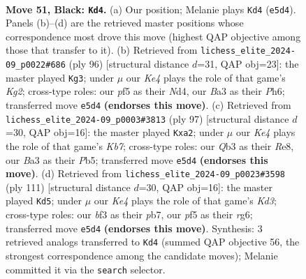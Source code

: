 \documentclass[11pt]{article}
\begin{document}
\clearpage

\begin{figure}[p]\centering
\begin{subfigure}{0.46\textwidth}\centering
\resizebox{\linewidth}{!}{%
\newchessgame
\chessboard[
  setfen={8/p7/8/1p2kPR1/8/bq3BK1/8/8 b - - 5 51},
  showmover=false,
  pgfstyle=straightmove, color=movearrow, markmove={e5-d4}
]}
\caption{}
\end{subfigure}\hfill
\begin{subfigure}{0.46\textwidth}\centering
\resizebox{\linewidth}{!}{%
\newchessgame
\chessboard[
  setfen={kn3Q2/1p6/7P/8/3N2P1/4P3/r5K1/8 w - - 3 49},
  showmover=false,
  pgfstyle=straightmove, color=movearrow, markmove={g2-g3}
]}
\caption{}
\end{subfigure}
\\[4pt]
\begin{subfigure}{0.46\textwidth}\centering
\resizebox{\linewidth}{!}{%
\newchessgame
\chessboard[
  setfen={4r3/4B3/4R3/1p6/2p5/8/Pk4P1/6K1 b - - 0 49},
  showmover=false,
  pgfstyle=straightmove, color=movearrow, markmove={b2-a2}
]}
\caption{}
\end{subfigure}\hfill
\begin{subfigure}{0.46\textwidth}\centering
\resizebox{\linewidth}{!}{%
\newchessgame
\chessboard[
  setfen={1q6/1P6/1K1k2R1/4p3/6P1/8/8/8 b - - 3 56},
  showmover=false,
  pgfstyle=straightmove, color=movearrow, markmove={d6-d5}
]}
\caption{}
\end{subfigure}
\caption{\textbf{Move 51, Black: \texttt{Kd4}.} (a) Our position; Melanie plays \texttt{Kd4} (\texttt{e5d4}). Panels (b)--(d) are the retrieved master positions whose correspondence most drove this move (highest QAP objective among those that transfer to it). (b) Retrieved from \texttt{lichess\_elite\_2024-09\_p0022\#686} (ply 96) [structural distance $d$=31, QAP obj=23]: the master played \texttt{Kg3}; under $\mu$ our \emph{Ke4} plays the role of that game's \emph{Kg2}; cross-type roles: our \emph{p}f5 as their \emph{N}d4, our \emph{B}a3 as their \emph{P}h6; transferred move \texttt{e5d4} \textbf{(endorses this move)}. (c) Retrieved from \texttt{lichess\_elite\_2024-09\_p0003\#3813} (ply 97) [structural distance $d$=30, QAP obj=16]: the master played \texttt{Kxa2}; under $\mu$ our \emph{Ke4} plays the role of that game's \emph{Kb7}; cross-type roles: our \emph{Q}b3 as their \emph{R}e8, our \emph{B}a3 as their \emph{P}b5; transferred move \texttt{e5d4} \textbf{(endorses this move)}. (d) Retrieved from \texttt{lichess\_elite\_2024-09\_p0023\#3598} (ply 111) [structural distance $d$=30, QAP obj=16]: the master played \texttt{Kd5}; under $\mu$ our \emph{Ke4} plays the role of that game's \emph{Kd3}; cross-type roles: our \emph{b}f3 as their \emph{p}b7, our \emph{p}f5 as their \emph{r}g6; transferred move \texttt{e5d4} \textbf{(endorses this move)}. Synthesis: 3 retrieved analogs transferred to \texttt{Kd4} (summed QAP objective 56, the strongest correspondence among the candidate moves); Melanie committed it via the \texttt{search} selector.}
\label{fig:thought-m101}
\end{figure}
\end{document}
